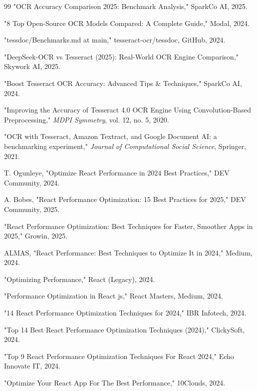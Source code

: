 \documentclass[conference]{IEEEtran}
\begin{document}
\begin{thebibliography}{99}
"OCR Accuracy Comparison 2025: Benchmark Analysis," SparkCo AI, 2025.

"8 Top Open-Source OCR Models Compared: A Complete Guide," Modal, 2024.

"tessdoc/Benchmarks.md at main," tesseract-ocr/tessdoc, GitHub, 2024.

"DeepSeek-OCR vs Tesseract (2025): Real-World OCR Engine Comparison," Skywork AI, 2025.

"Boost Tesseract OCR Accuracy: Advanced Tips \& Techniques," SparkCo AI, 2024.

"Improving the Accuracy of Tesseract 4.0 OCR Engine Using Convolution-Based Preprocessing," \textit{MDPI Symmetry}, vol. 12, no. 5, 2020.

"OCR with Tesseract, Amazon Textract, and Google Document AI: a benchmarking experiment," \textit{Journal of Computational Social Science}, Springer, 2021.

T. Ogunleye, "Optimize React Performance in 2024  Best Practices," DEV Community, 2024.

A. Bobes, "React Performance Optimization: 15 Best Practices for 2025," DEV Community, 2025.

"React Performance Optimization: Best Techniques for Faster, Smoother Apps in 2025," Growin, 2025.

ALMAS, "React Performance: Best Techniques to Optimize It in 2024," Medium, 2024.

"Optimizing Performance," React (Legacy), 2024.

"Performance Optimization in React js," React Masters, Medium, 2024.

"14 React Performance Optimization Techniques for 2024," IBR Infotech, 2024.

"Top 14 Best React Performance Optimization Techniques (2024)," ClickySoft, 2024.

"Top 9 React Performance Optimization Techniques For React 2024," Echo Innovate IT, 2024.

"Optimize Your React App For The Best Performance," 10Clouds, 2024.


\end{thebibliography}
\end{document}

